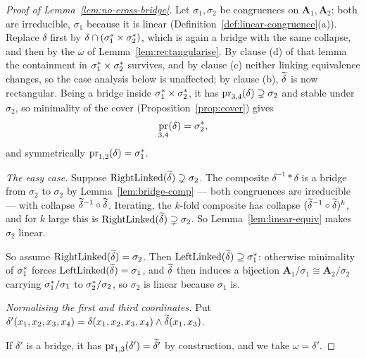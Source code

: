 \begin{proof}[Proof of Lemma~\ref{lem:no-cross-bridge}]
Let $\sigma_{1},\sigma_{2}$ be congruences on $\mathbf A_{1},\mathbf A_{2}$;
both are irreducible, $\sigma_{1}$ because it is linear
(Definition~\ref{def:linear-congruence}(a)). Replace $\delta$ first by
$\delta\cap(\sigma_{1}^{*}\times\sigma_{2}^{*})$, which is again a
bridge with the same collapse, and then by the $\omega$ of
Lemma~\ref{lem:rectangularise}. By clause (d) of that lemma the containment in
$\sigma_{1}^{*}\times\sigma_{2}^{*}$ survives, and by clause (c)
neither linking equivalence changes, so the case analysis below is unaffected;
by clause (b), $\widetilde{\delta}$ is now rectangular. Being a bridge inside
$\sigma_{1}^{*}\times\sigma_{2}^{*}$, it has
$\operatorname*{pr}_{3,4}(\delta)\supsetneq\sigma_{2}$ and stable under $\sigma_{2}$, so
minimality of the cover (Proposition~\ref{prop:cover}) gives
\begin{equation}\label{eq:ncb-proj}
  \operatorname*{pr}_{3,4}(\delta)=\sigma_{2}^{*},
\end{equation}
and symmetrically $\operatorname*{pr}_{1,2}(\delta)=\sigma_{1}^{*}$.

\emph{The easy case.} Suppose $\operatorname{RightLinked}(\widetilde{\delta})\supsetneq\sigma_{2}$.
The composite $\delta^{-1}\ast\delta$ is a bridge from $\sigma_{2}$ to
$\sigma_{2}$ by Lemma~\ref{lem:bridge-comp} --- both congruences are
irreducible --- with collapse $\widetilde{\delta}^{-1}\circ\widetilde{\delta}$. Iterating,
the $k$-fold composite has collapse $(\widetilde{\delta}^{-1}\circ\widetilde{\delta})^{k}$,
and for $k$ large this is $\operatorname{RightLinked}(\widetilde{\delta})\supsetneq\sigma_{2}$. So
Lemma~\ref{lem:linear-equiv} makes $\sigma_{2}$ linear.

So assume $\operatorname{RightLinked}(\widetilde{\delta})=\sigma_{2}$. Then
$\operatorname{LeftLinked}(\widetilde{\delta})\supseteq\sigma_{1}^{*}$: otherwise minimality of
$\sigma_{1}^{*}$ forces $\operatorname{LeftLinked}(\widetilde{\delta})=\sigma_{1}$, and
$\widetilde{\delta}$ then induces a bijection
$\mathbf A_{1}/\sigma_{1}\cong\mathbf A_{2}/\sigma_{2}$ carrying
$\sigma_{1}^{*}/\sigma_{1}$ to $\sigma_{2}^{*}/\sigma_{2}$, so
$\sigma_{2}$ is linear because $\sigma_{1}$ is.

\emph{Normalising the first and third coordinates.} Put
$\delta'(x_{1},x_{2},x_{3},x_{4})=\delta(x_{1},x_{2},x_{3},x_{4})\wedge
\widetilde{\delta}(x_{1},x_{3})$.

If $\delta'$ is a bridge, it has $\operatorname*{pr}_{1,3}(\delta')=\widetilde{\delta'}$ by
construction, and we take $\omega=\delta'$.


\end{proof}

